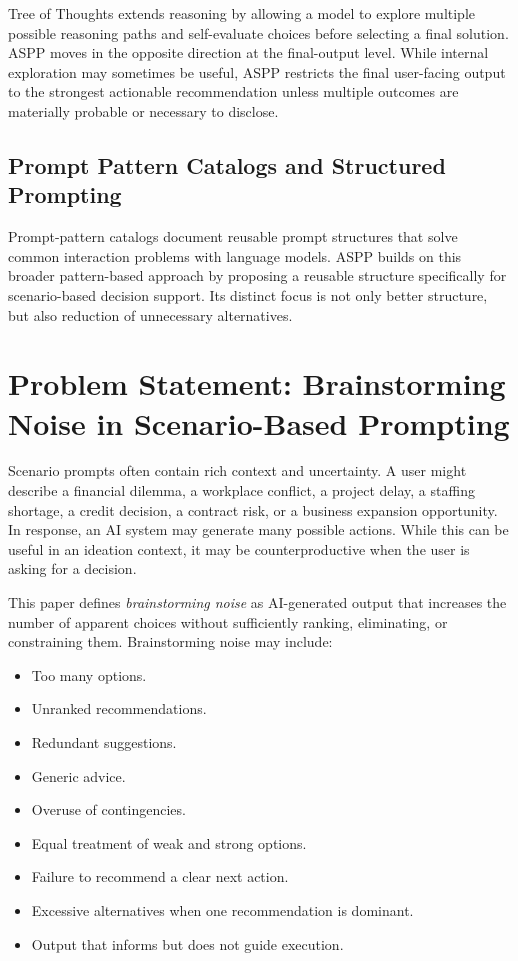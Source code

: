 \documentclass[11pt]{article}
\begin{document}
Tree of Thoughts extends reasoning by allowing a model to explore multiple possible reasoning paths and self-evaluate choices before selecting a final solution. ASPP moves in the opposite direction at the final-output level. While internal exploration may sometimes be useful, ASPP restricts the final user-facing output to the strongest actionable recommendation unless multiple outcomes are materially probable or necessary to disclose.

\subsection{Prompt Pattern Catalogs and Structured Prompting}

Prompt-pattern catalogs document reusable prompt structures that solve common interaction problems with language models. ASPP builds on this broader pattern-based approach by proposing a reusable structure specifically for scenario-based decision support. Its distinct focus is not only better structure, but also reduction of unnecessary alternatives.

\section{Problem Statement: Brainstorming Noise in Scenario-Based Prompting}

Scenario prompts often contain rich context and uncertainty. A user might describe a financial dilemma, a workplace conflict, a project delay, a staffing shortage, a credit decision, a contract risk, or a business expansion opportunity. In response, an AI system may generate many possible actions. While this can be useful in an ideation context, it may be counterproductive when the user is asking for a decision.

This paper defines \textit{brainstorming noise} as AI-generated output that increases the number of apparent choices without sufficiently ranking, eliminating, or constraining them. Brainstorming noise may include:

\begin{itemize}[leftmargin=*]
    \item Too many options.
    \item Unranked recommendations.
    \item Redundant suggestions.
    \item Generic advice.
    \item Overuse of contingencies.
    \item Equal treatment of weak and strong options.
    \item Failure to recommend a clear next action.
    \item Excessive alternatives when one recommendation is dominant.
    \item Output that informs but does not guide execution.
\end{itemize}
\end{document}
